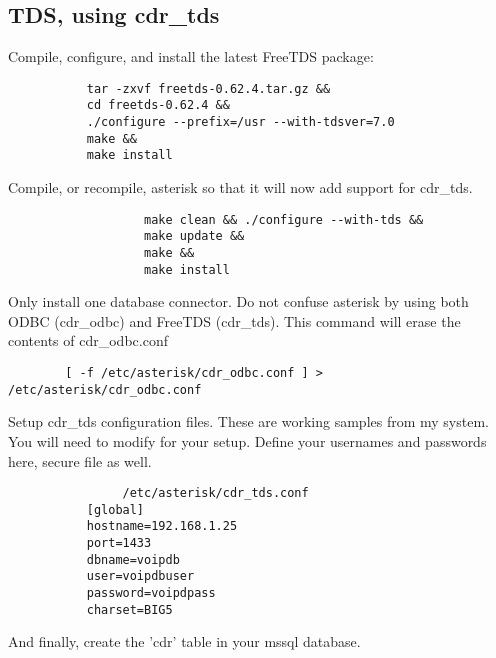 \subsection{TDS, using cdr\_tds}
		Compile, configure, and install the latest FreeTDS package:
\begin{astlisting}
\begin{verbatim}
		   tar -zxvf freetds-0.62.4.tar.gz &&
		   cd freetds-0.62.4 &&
		   ./configure --prefix=/usr --with-tdsver=7.0
		   make &&
		   make install
\end{verbatim}
\end{astlisting}
                Compile, or recompile, asterisk so that it will now add support
                for cdr\_tds.
\begin{astlisting}
\begin{verbatim}
                   make clean && ./configure --with-tds &&
                   make update &&
                   make &&
                   make install
\end{verbatim}
\end{astlisting}
                Only install one database connector.  Do not confuse asterisk
                by using both ODBC (cdr\_odbc) and FreeTDS (cdr\_tds).
                This command will erase the contents of cdr\_odbc.conf
\begin{astlisting}
\begin{verbatim}
		[ -f /etc/asterisk/cdr_odbc.conf ] > /etc/asterisk/cdr_odbc.conf
\end{verbatim}
\end{astlisting}
                Setup cdr\_tds configuration files.  These are working samples
                from my system.  You will need to modify for your setup. Define
                your usernames and passwords here, secure file as well.
\begin{astlisting}
\begin{verbatim}
                /etc/asterisk/cdr_tds.conf
		   [global]
		   hostname=192.168.1.25
		   port=1433
		   dbname=voipdb
		   user=voipdbuser
		   password=voipdpass
		   charset=BIG5
\end{verbatim}
\end{astlisting}
                And finally, create the 'cdr' table in your mssql database.
